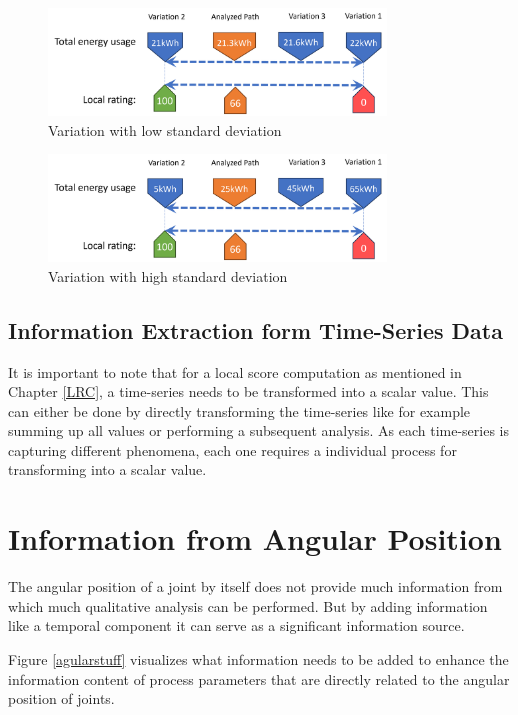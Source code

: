 \begin{figure}[H]
	\centerline{\includegraphics[width=0.8\textwidth]{figures/lowstd.png}}
	\caption{Variation with low standard deviation}
	\label{lowstd}
\end{figure}

\begin{figure}[H]
	\centerline{\includegraphics[width=0.8\textwidth]{figures/highstd.png}}
	\caption{Variation with high standard deviation}
	\label{highstd}
\end{figure}

 
\subsection{Information Extraction form Time-Series Data}\label{extraction}
It is important to note that for a local score computation as mentioned in Chapter \ref{LRC}, a time-series needs to be transformed into a scalar value. This can either be done by directly transforming the time-series like for example summing up all values or performing a subsequent analysis. As each time-series is capturing different phenomena, each one requires a individual process for transforming into a scalar value.
\newpage




\section{Information from Angular Position}
The angular position of a joint by itself does not provide much information from which much qualitative analysis can be performed. But by adding information like a temporal component it can serve as a significant information source. 

Figure \ref{agularstuff} visualizes what information needs to be added to enhance the information content of process parameters that are directly related to the angular position of joints.

